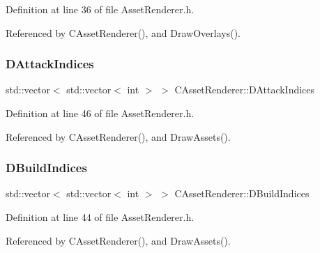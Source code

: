 Definition at line 36 of file Asset\+Renderer.\+h.



Referenced by C\+Asset\+Renderer(), and Draw\+Overlays().

\hypertarget{classCAssetRenderer_acc2d0fab5a9f1f35a1d5eaf28ff743cc}{}\label{classCAssetRenderer_acc2d0fab5a9f1f35a1d5eaf28ff743cc} 
\subsubsection{\texorpdfstring{D\+Attack\+Indices}{DAttackIndices}}
{\footnotesize\ttfamily std\+::vector$<$ std\+::vector$<$ int $>$ $>$ C\+Asset\+Renderer\+::\+D\+Attack\+Indices\hspace{0.3cm}{\ttfamily [protected]}}



Definition at line 46 of file Asset\+Renderer.\+h.



Referenced by C\+Asset\+Renderer(), and Draw\+Assets().

\hypertarget{classCAssetRenderer_aa892b01d11bef2aca7491461eb97dffb}{}\label{classCAssetRenderer_aa892b01d11bef2aca7491461eb97dffb} 
\subsubsection{\texorpdfstring{D\+Build\+Indices}{DBuildIndices}}
{\footnotesize\ttfamily std\+::vector$<$ std\+::vector$<$ int $>$ $>$ C\+Asset\+Renderer\+::\+D\+Build\+Indices\hspace{0.3cm}{\ttfamily [protected]}}



Definition at line 44 of file Asset\+Renderer.\+h.



Referenced by C\+Asset\+Renderer(), and Draw\+Assets().

\hypertarget{classCAssetRenderer_a9eb73be9e270946c01ba769112e92d1d}{}\label{classCAssetRenderer_a9eb73be9e270946c01ba769112e92d1d} 
